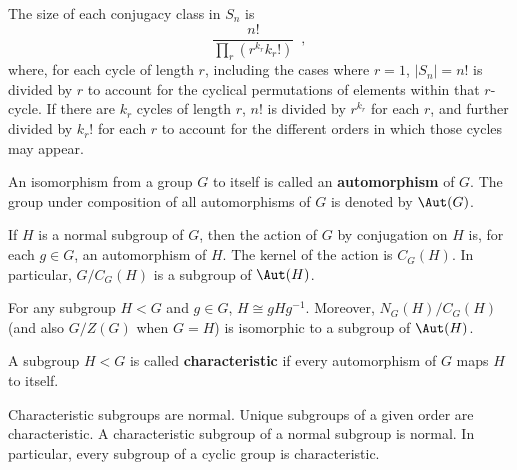 \begin{example}
	\cite[132]{DummitFoote2004}
	The size of each conjugacy class in $S_n$ is
	\begin{equation}
		\frac{n!}{\prod_{r}(r^{k_r}k_r!)} \enspace,
	\end{equation}
	where, for each cycle of length $r$, including the cases where $r = 1$, $|S_n| = n!$ is divided by $r$ to account for the cyclical permutations of elements within that $r$-cycle. If there are $k_r$ cycles of length $r$, $n!$ is divided by $r^{k_r}$ for each $r$, and further divided by $k_r!$ for each $r$ to account for the different orders in which those cycles may appear.
\end{example}

\begin{definition}
	\cite[133]{DummitFoote2004}
	An isomorphism from a group $G$ to itself is called an \textbf{automorphism} of $G$.
	The group under composition of all automorphisms of $G$ is denoted by $\Aut(G)$.
\end{definition}

\pagebreak
\begin{proposition}
	\cite[133]{DummitFoote2004}
	If $H$ is a normal subgroup of $G$, then the action of $G$
	by conjugation on $H$ is, for each $g \in G$, an automorphism of $H$. The kernel of the
	action is $C_G(H)$. In particular, $G / C_G(H)$ is a subgroup of $\Aut(H)$.
\end{proposition}

\begin{corollary}
	\cite[134]{DummitFoote2004}
	For any subgroup $H < G$ and $g \in G$, $H \cong gHg^{-1}$. Moreover, $N_G(H) / C_G(H)$
	(and also $G/Z(G)$ when $G = H$) is isomorphic to a subgroup of $\Aut(H)$.
\end{corollary}

\begin{definition}
	\cite[135]{DummitFoote2004}
	A subgroup $H < G$ is called \textbf{characteristic} if every automorphism of $G$ maps
	$H$ to itself.
\end{definition}

\begin{proposition}
	\cite[135]{DummitFoote2004}
	Characteristic subgroups are normal. Unique subgroups of a given order are
	characteristic. A characteristic subgroup of a normal subgroup is normal. In particular,
	every subgroup of a cyclic group is characteristic.
\end{proposition}


